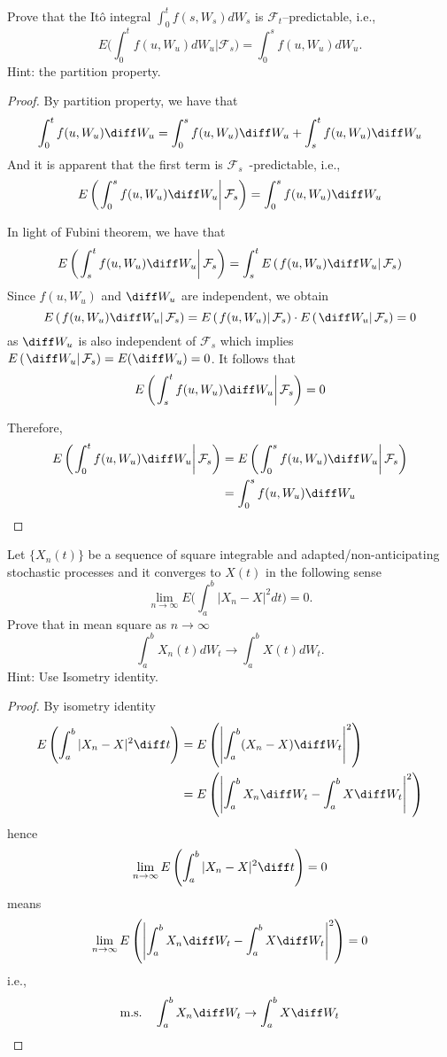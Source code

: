    \problem
    \begin{question}
        Prove that the It\^o integral $\int_0^t f(s,W_s)dW_s$ is $\mathcal F_t$--predictable, i.e.,
        \[E\Big(\int_0^t f(u,W_u)dW_u |\mathcal F_s\Big)=\int_0^s f(u,W_u)dW_u.\]
        Hint: the partition property. 
    \end{question}
    \begin{proof}
        \newcommand{\conde}[1]{E\left(\left. #1\right|\mathcal F_s\right)}
        By partition property, we have that
        \[\int_0^tf(u,W_u)\diff W_u=\int_0^sf(u,W_u)\diff W_u
        +\int_s^tf(u,W_u)\diff W_u\]
        And it is apparent that the first term is
        $\mathcal F_s$~-predictable, i.e.,
        \[\conde{\int_0^sf(u,W_u)\diff W_u}=\int_0^sf(u,W_u)\diff W_u\]
        

        In light of Fubini theorem, we have that
        \[\conde{\int_s^tf(u,W_u)\diff W_u}
            =\int_s^t\conde{f(u,W_u)\diff W_u}\]
        Since $f(u,W_u)$ and $\diff W_u$ are independent, we obtain
        \[\conde{f(u,W_u)\diff W_u}=\conde{f(u,W_u)}\cdot\conde{\diff W_u}
        =0\]
        as $\diff W_u$ is also independent of $\mathcal F_s$ which implies
        $\conde{\diff W_u}=E(\diff W_u)=0$. It follows that
        \[\conde{\int_s^tf(u,W_u)\diff W_u}=0\]

        Therefore,
        \[\begin{aligned}
        \conde{\int_0^tf(u,W_u)\diff W_u}
        &=\conde{\int_0^sf(u,W_u)\diff W_u}\\
        &=\int_0^sf(u,W_u)\diff W_u
        \end{aligned}\]
    \end{proof}


    \problem
    \begin{question}
        Let $\{X_n(t)\}$ be a sequence of square integrable
        and adapted/non-anticipating stochastic processes and
        it converges to $X(t)$ in the following sense
        \[\lim_{n\rightarrow \infty}E\Big(\int_a^b |X_n-X|^2 dt\Big)=0.\]
        Prove that in mean square as $n\rightarrow\infty$
        \[\int_a^b X_n(t)dW_t\rightarrow \int_a^b X(t)dW_t.\]
        Hint: Use Isometry identity. 
    \end{question}
    \begin{proof}
        By isometry identity
        \[\begin{aligned}
            E\left(\int_a^b|X_n-X|^2\diff t\right)
            &=E\left(\left|\int_a^b(X_n-X)\diff W_t\right|^2\right)\\
            &=E\left(\left|
            \int_a^bX_n\diff W_t-\int_a^bX\diff W_t
            \right|^2\right)
        \end{aligned}\]
        hence
        \[\lim_{n\to\infty}E\left(
            \int_a^b|X_n-X|^2\diff t\right)=0\]
        means
        \[\lim_{n\to\infty}E\left(\left|
            \int_a^bX_n\diff W_t-\int_a^bX\diff W_t
            \right|^2\right)=0\]
        i.e.,
        \[\text{m.s.}\quad
        \int_a^bX_n\diff W_t\to\int_a^bX\diff W_t\]
    \end{proof}

